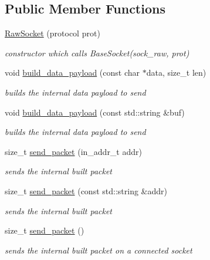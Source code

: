 \subsection*{Public Member Functions}
\begin{CompactItemize}
\item 
\hyperlink{classsocketpp_1_1RawSocket_1a77e11388869bc70457efb75cd40b82}{RawSocket} (protocol prot)
\begin{CompactList}\small\item\em constructor which calls BaseSocket(sock\_\-raw, prot) \item\end{CompactList}\item 
void \hyperlink{classsocketpp_1_1RawSocket_99ea2415525269d24ba088a58d62abdd}{build\_\-data\_\-payload} (const char $\ast$data, size\_\-t len)
\begin{CompactList}\small\item\em builds the internal data payload to send \item\end{CompactList}\item 
void \hyperlink{classsocketpp_1_1RawSocket_a5e01f4dec94dbbef1c122ce4d7ed4ad}{build\_\-data\_\-payload} (const std::string \&buf)
\begin{CompactList}\small\item\em builds the internal data payload to send \item\end{CompactList}\item 
size\_\-t \hyperlink{classsocketpp_1_1RawSocket_5c812c1bf584f40c3fc6263a8014395b}{send\_\-packet} (in\_\-addr\_\-t addr)
\begin{CompactList}\small\item\em sends the internal built packet \item\end{CompactList}\item 
size\_\-t \hyperlink{classsocketpp_1_1RawSocket_6dfb29dbfedf61d8f082dc1893320d42}{send\_\-packet} (const std::string \&addr)
\begin{CompactList}\small\item\em sends the internal built packet \item\end{CompactList}\item 
size\_\-t \hyperlink{classsocketpp_1_1RawSocket_e987bb77fd3ac6d0e99b5311ff81c1ea}{send\_\-packet} ()
\begin{CompactList}\small\item\em sends the internal built packet on a connected socket \item\end{CompactList}\item 

\end{CompactItemize}
